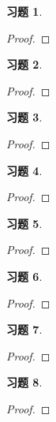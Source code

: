 \documentclass{ctexart}
\newtheorem{problem}{习题}[section]
\begin{document}
\setcounter{problem}{11}
\begin{problem}
\end{problem}
\begin{proof}

\end{proof}

\begin{problem}
\end{problem}
\begin{proof}

\end{proof}

\begin{problem}
\end{problem}
\begin{proof}

\end{proof}

\setcounter{problem}{15}
\begin{problem}
\end{problem}
\begin{proof}

\end{proof}

\begin{problem}
\end{problem}
\begin{proof}

\end{proof}

\setcounter{problem}{20}
\begin{problem}
\end{problem}
\begin{proof}

\end{proof}

\setcounter{problem}{22}
\begin{problem}
\end{problem}
\begin{proof}

\end{proof}

\setcounter{problem}{26}
\begin{problem}
\end{problem}
\begin{proof}

\end{proof}
\end{document}

